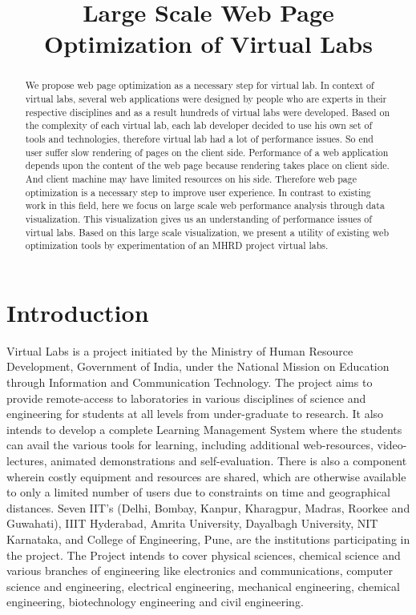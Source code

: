 \documentclass[conference]{IEEEtran}
\title{Large Scale Web Page Optimization of Virtual Labs}
\begin{document}
\maketitle

\begin{abstract}
We propose web page optimization as a necessary step for virtual lab.
In context of virtual labs, several web applications were designed by people who are 
experts in their respective disciplines and as a result hundreds of virtual labs were developed.
Based on the complexity of each virtual lab, each lab developer decided to use his own 
set of tools and technologies, therefore virtual lab had a lot of performance issues.
So end user suffer slow rendering of pages on the client side.
Performance of a web application depends upon the content of the web
page because rendering takes place on client side. 
And client machine may have limited resources on his side. Therefore web page
optimization is a necessary step to improve user experience.
In contrast to existing work in this field, here we focus on large scale web
performance analysis through data visualization. This visualization gives
us an understanding of performance issues of virtual labs. Based on this large scale visualization,
we present a utility of existing web optimization tools by experimentation of an
MHRD project virtual labs.
\end{abstract}

\section{Introduction}\label{sec-2}
Virtual Labs is a project initiated by the Ministry of Human Resource Development, Government of India,
under the National Mission on Education through Information and Communication Technology.
The project aims to provide remote-access to laboratories in various disciplines of science
and engineering for students at all levels from under-graduate to research.
It also intends to develop a complete Learning Management System where the students can avail the
various tools for learning, including additional web-resources, video-lectures, animated demonstrations
and self-evaluation. There is also a component wherein costly equipment and resources are shared, which
are otherwise available to only a limited number of users due to constraints on time and geographical distances.
Seven IIT's (Delhi, Bombay, Kanpur, Kharagpur, Madras, Roorkee and Guwahati), IIIT Hyderabad, Amrita University,
Dayalbagh University, NIT Karnataka, and College of Engineering, Pune, are the institutions participating in the project.
The Project intends to cover physical sciences, chemical science and various branches of engineering like electronics and
communications, computer science and engineering, electrical engineering, mechanical engineering, chemical engineering,
biotechnology engineering and civil engineering.
\end{document}
